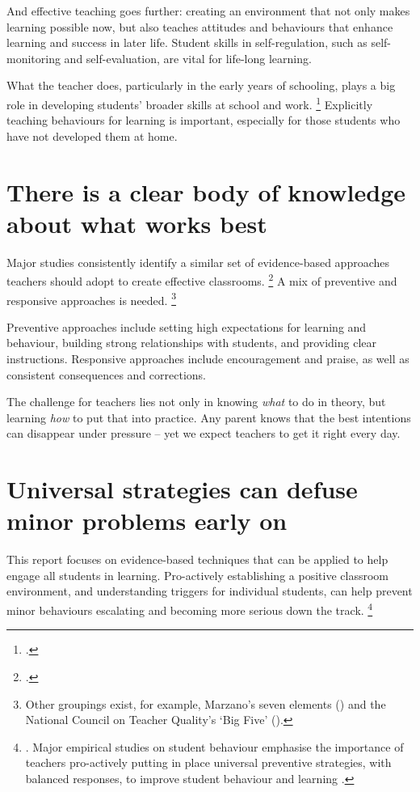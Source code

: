 \documentclass[FrontPage]{grattan}
\begin{document}
And effective teaching goes further: creating an environment that not only makes learning possible now, but also teaches attitudes and behaviours that enhance learning and success in later life. Student skills in self-regulation, such as self-monitoring and self-evaluation, are vital for life-long learning.

What the teacher does, particularly in the early years of schooling, plays a big role in developing students' broader skills at school and work.%
    \footcites{Watkins2005ClassroomsLearningCommunities}{Watkins2013DisposedToLearn}
Explicitly teaching behaviours for learning is important, especially for those students who have not developed them at home. 

\section{There is a clear body of knowledge about what works best}\label{sec:clear-body-knowledge}
Major studies consistently identify a similar set of evidence-based approaches teachers should adopt to create effective classrooms.%
    \footcites{Hattie2008visiblelearningsynthesis}{Marzano2003ClassroomManagementWorks}{Simonsen2008EvidenceBasedPractices}
A mix of preventive and responsive approaches is needed.%
    \footnote{Other groupings exist, for example, Marzano's seven elements (\textcite{Marzano2003ClassroomManagementWorks}) and the National Council on Teacher Quality's ‘Big Five' (\textcite{Greenberg2014TrainingOurFuture}).}

Preventive approaches include setting high expectations for learning and behaviour, building strong relationships with students, and providing clear instructions. Responsive approaches include encouragement and praise, as well as consistent consequences and corrections. 

The challenge for teachers lies not only in knowing \emph{what} to do in theory, but learning \emph{how} to put that into practice. Any parent knows that the best intentions can disappear under pressure -- yet we expect teachers to get it right every day.

\section{Universal strategies can defuse minor problems early on }\label{sec:universal-strategies}

This report focuses on evidence-based techniques that can be applied to help engage all students in learning. Pro-actively establishing a positive classroom environment, and  understanding triggers for individual students, can help prevent minor behaviours escalating and becoming more serious down the track.%
    \footnote{\textcite{ShuklaMehtaAlbin2003TwelvePracticalStrategies}. Major empirical studies on student behaviour emphasise the importance of teachers pro-actively putting in place universal preventive strategies, with balanced responses, to improve student behaviour  and learning \textcites{Greenberg2014TrainingOurFuture}{Simonsen2008EvidenceBasedPractices}.}
\end{document}
